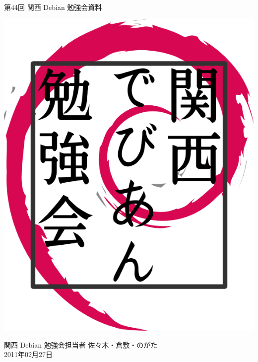 \documentclass[mingoth,a4paper]{jsarticle}
\newcommand{\debmtgyear}{2011}
\newcommand{\debmtgdate}{27}
\newcommand{\debmtgmonth}{02}
\newcommand{\debmtgnumber}{44}
\begin{document}
\begin{titlepage}


 第\debmtgnumber{}回 関西 Debian 勉強会資料

\vspace{2cm}

\begin{center}
\includegraphics{image200802/kansaidebianlogo.png}
\end{center}

\begin{flushright}
\hfill{}関西 Debian 勉強会担当者 佐々木・倉敷・のがた \\
\hfill{}\debmtgyear{}年\debmtgmonth{}月\debmtgdate{}日
\end{flushright}

\thispagestyle{empty}
\end{titlepage}


\subsection*{}%
\end{document}
